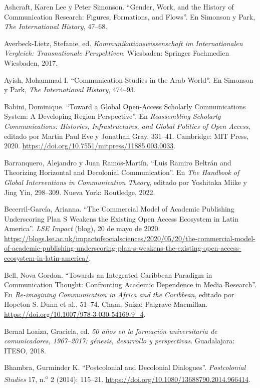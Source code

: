 \documentclass{tufte-handout}
\begin{document}
\begin{hangparas}{.25in}{1}
Ashcraft, Karen Lee y Peter Simonson. ``Gender, Work, and the History of
Communication Research: Figures, Formations, and Flows''. En Simonson y
Park, \emph{The International History}, 47--68.

Averbeck-Lietz, Stefanie, ed. \emph{Kommunikationswissenschaft im
Internationalen Vergleich: Transnationale Perspektiven}. Wiesbaden:
Springer Fachmedien Wiesbaden, 2017.

Ayish, Mohammad I. ``Communication Studies in the Arab World''. En
Simonson y Park, \emph{The International History}, 474--93.

Babini, Dominique. ``Toward a Global Open-Access Scholarly
Communications System: A Developing Region Perspective''. En
\emph{Reassembling Scholarly Communications: Histories, Infrastructures,
and Global Politics of Open Access}, editado por Martin Paul Eve y
Jonathan Gray, 331--41. Cambridge: MIT Press, 2020.
\url{https://doi.org/10.7551/mitpress/11885.003.0033}.

Barranquero, Alejandro y Juan Ramos-Martín. ``Luis Ramiro Beltrán and
Theorizing Horizontal and Decolonial Communication''. En \emph{The
Handbook of Global Interventions in Communication Theory}, editado por
Yoshitaka Miike y Jing Yin, 298--309. Nueva York: Routledge, 2022.

Becerril-García, Arianna. ``The Commercial Model of Academic Publishing
Underscoring Plan S Weakens the Existing Open Access Ecosystem in Latin
America''. \emph{LSE Impact} (blog), 20 de mayo de 2020.
\href{https://blogs.lse.ac.uk/impactofsocialsciences/2020/05/20/the-commercial-model-of-academic-publishing-underscoring-plan-s-weakens-the-existing-open-access-ecosystem-in-latin-america/}{https://blogs.lse.ac.uk/impactofsocialsciences/2020/05/20/the-commercial-model-of-academic-publishing-underscoring-plan-s-weakens-the-existing-open-access-ecosystem-in-latin-america/}.

Bell, Nova Gordon. ``Towards an Integrated Caribbean Paradigm in
Communication Thought: Confronting Academic Dependence in Media
Research''. En \emph{Re-imagining Communication in Africa and the
Caribbean}, editado por Hopeton S. Dunn et al., 51--74. Cham, Suiza:
Palgrave Macmillan. \url{https://doi.org/10.1007/978-3-030-54169-9_4}.

Bernal Loaiza, Graciela, ed. \emph{50 años en la formación universitaria
de comunicadores, 1967--2017: génesis, desarrollo y perspectivas}.
Guadalajara: ITESO, 2018.

Bhambra, Gurminder K. ``Postcolonial and Decolonial Dialogues''.
\emph{Postcolonial Studies} 17, n.\textsuperscript{o} 2 (2014): 115--21.
\url{https://doi.org/10.1080/13688790.2014.966414}.


\end{hangparas}
\end{document}
